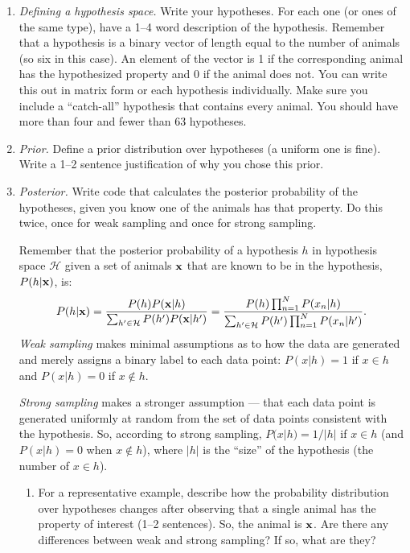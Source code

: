 \documentclass[11pt]{article}
\begin{document}
\begin{enumerate}
\item {\em Defining a hypothesis space.} Write your hypotheses. For each one (or ones of the same type), have a 1--4 word description of the hypothesis. Remember that a hypothesis is a binary vector of length equal to the number of animals (so six in this case). An element of the vector is 1 if the corresponding animal has the hypothesized property and 0 if the animal does not. You can write this out in matrix form or each hypothesis individually. Make sure you include a ``catch-all'' hypothesis that contains every animal. You should have more than four and fewer than 63 hypotheses.

\item {\em Prior.} Define a prior distribution over hypotheses (a uniform one is fine). Write a 1--2 sentence justification of why you chose this prior.

\item {\em Posterior.} Write code that calculates the posterior probability of the hypotheses, given you know one of the animals has that property. Do this twice, once for weak sampling and once for strong sampling.

Remember that the posterior probability of a hypothesis $h$ in hypothesis space $\mathcal{H}$ given a set of animals ${\bf x}$ that are known to be in the hypothesis, $P(h | {\bf x})$, is:
 \begin{equation}
 P(h | {\bf x}) = \frac{P(h) P({\bf x} | h)}{\sum_{h' \in \mathcal{H}} {P(h') P( {\bf x} | h')  }} = \frac{P(h)  \prod_{n=1}^N{P(x_n | h)}}{\sum_{h' \in  \mathcal{H}} { P(h') \prod_{n=1}^N{P(x_n | h')} }}.
 \end{equation}
{\em Weak sampling} makes minimal assumptions as to how the data are generated and merely assigns a binary label to each data point: $P(x|h)=1$ if $x \in h$ and $P(x|h) = 0$ if $x \notin h$.

{\em Strong sampling} makes a stronger assumption --- that each data point is generated uniformly at random from the set of data points consistent with the hypothesis. So, according to strong sampling, $P(x|h)=1/|h|$ if $x \in h$ (and $P(x|h)=0$ when $x \notin h$), where $|h|$ is the ``size'' of the hypothesis (the number of $x \in h$).
\begin{enumerate}
\item For a representative example, describe how the probability distribution over hypotheses changes after observing that a single animal has the property of interest (1--2 sentences). So, the animal is ${\bf x}$. Are there any differences between weak and strong sampling? If so, what are they?


\end{enumerate}
\end{enumerate}
\end{document}
